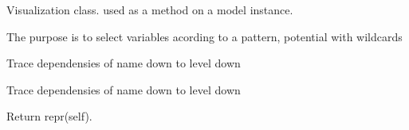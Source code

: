 \documentclass[letterpaper,10pt,english]{sphinxmanual}
\begin{document}
\begin{fulllineitems}
\label{\detokenize{index:modelvis.varvis}}
\pysigstartsignatures
{}
\pysigstopsignatures
\sphinxAtStartPar
Visualization class. used as a method on a model instance.

\sphinxAtStartPar
The purpose is to select variables acording to a pattern, potential with wildcards

\begin{fulllineitems}
\label{\detokenize{index:modelvis.varvis.tracedep}}
\pysigstartsignatures
{}
\pysigstopsignatures
\sphinxAtStartPar
Trace dependensies of name down to level down

\end{fulllineitems}


\begin{fulllineitems}
\label{\detokenize{index:modelvis.varvis.tracepre}}
\pysigstartsignatures
{}
\pysigstopsignatures
\sphinxAtStartPar
Trace dependensies of name down to level down

\end{fulllineitems}


\begin{fulllineitems}
\label{\detokenize{index:modelvis.varvis.__repr__}}
\pysigstartsignatures
{}
\pysigstopsignatures
\sphinxAtStartPar
Return repr(self).

\end{fulllineitems}


\end{fulllineitems}
\end{document}
